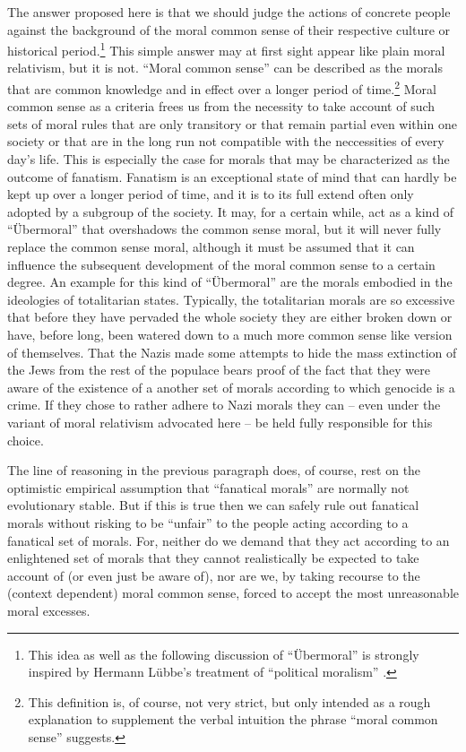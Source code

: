 \documentclass[12pt,a4paper,ngerman]{article}
\begin{document}
The answer proposed here is that we should judge the actions of
concrete people against the background of the moral common sense of
their respective culture or historical period.\footnote{This idea as
  well as the following discussion of ``\"Ubermoral'' is strongly
  inspired by Hermann L\"ubbe's treatment of ``political moralism''
  \cite[]{luebbe:1987}.} This simple answer may at first sight appear
like plain moral relativism, but it is not.  ``Moral common sense''
can be described as the morals that are common knowledge and in effect
over a longer period of time.\footnote{This definition is, of course,
  not very strict, but only intended as a rough explanation to
  supplement the verbal intuition the phrase ``moral common sense''
  suggests.}  Moral common sense as a criteria frees us from the
necessity to take account of such sets of moral rules that are only
transitory or that remain partial even within one society or that are
in the long run not compatible with the neccessities of every day's
life. This is especially the case for morals that may be characterized
as the outcome of fanatism. Fanatism is an exceptional state of mind
that can hardly be kept up over a longer period of time, and it is to
its full extend often only adopted by a subgroup of the society.  It
may, for a certain while, act as a kind of ``\"Ubermoral'' that
overshadows the common sense moral, but it will never fully replace
the common sense moral, although it must be assumed that it can
influence the subsequent development of the moral common sense to a
certain degree. An example for this kind of ``\"Ubermoral'' are the
morals embodied in the ideologies of totalitarian states. Typically,
the totalitarian morals are so excessive that before they have
pervaded the whole society they are either broken down or have, before
long, been watered down to a much more common sense like version of
themselves. That the Nazis made some attempts to hide the mass
extinction of the Jews from the rest of the populace bears proof of
the fact that they were aware of the existence of a another set of
morals according to which genocide is a crime. If they chose to rather
adhere to Nazi morals they can -- even under the variant of moral
relativism advocated here -- be held fully responsible for this
choice.

The line of reasoning in the previous paragraph does, of course, rest
on the optimistic empirical assumption that ``fanatical morals'' are
normally not evolutionary stable. But if this is true then we can
safely rule out fanatical morals without risking to be ``unfair'' to
the people acting according to a fanatical set of morals. For, neither
do we demand that they act according to an enlightened set of morals
that they cannot realistically be expected to take account of (or 
even just be aware of), nor are we, by taking recourse to the (context
dependent) moral common sense, forced to accept the most unreasonable
moral excesses.
\end{document}
